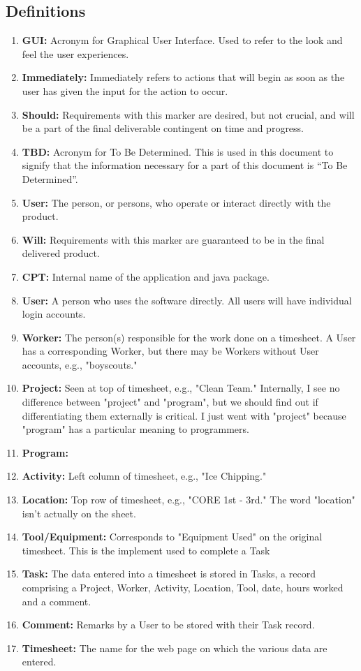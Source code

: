 \documentclass[12pt]{article}
\begin{document}
\subsection{Definitions}
\begin{enumerate}
\item \textbf{GUI:} Acronym for Graphical User Interface. Used to refer to the look and feel the user experiences.
\item \textbf{Immediately:} Immediately refers to actions that will begin as soon as the user has given the input for the action to occur.
\item \textbf{Should:} Requirements with this marker are desired, but not crucial, and will be a part of the final deliverable contingent on time and progress.
\item \textbf{TBD:} Acronym for To Be Determined. This is used in this document to signify that the information necessary for a part of this document is ``To Be Determined''.
\item \textbf{User:} The person, or persons, who operate or interact directly with the product.
\item \textbf{Will:} Requirements with this marker are guaranteed to be in the final delivered product.
\item \textbf{CPT:} Internal name of the application and java package.
\item \textbf{User:} A person who uses the software directly. All users will have individual login accounts.
\item \textbf{Worker:} The person(s) responsible for the work done on a timesheet. A User has a corresponding Worker, but there may be Workers without User accounts, e.g., "boyscouts."
\item \textbf{Project:} Seen at top of timesheet, e.g., "Clean Team." Internally, I see no difference between "project" and "program", but we should find out if differentiating them externally is critical. I just went with "project" because "program" has a particular meaning to programmers.
\item \textbf{Program:} 
\item \textbf{Activity:} Left column of timesheet, e.g., "Ice Chipping."
\item \textbf{Location:} Top row of timesheet, e.g., "CORE 1st - 3rd." The word "location" isn't actually on the sheet.
\item \textbf{Tool/Equipment:} Corresponds to "Equipment Used" on the original timesheet. This is the implement used to complete a Task
\item \textbf{Task:} The data entered into a timesheet is stored in Tasks, a record comprising a Project, Worker, Activity, Location, Tool, date, hours worked and a comment.
\item \textbf{Comment:} Remarks by a User to be stored with their Task record.
\item \textbf{Timesheet:} The name for the web page on which the various data are entered.
\end{enumerate}
\end{document}
